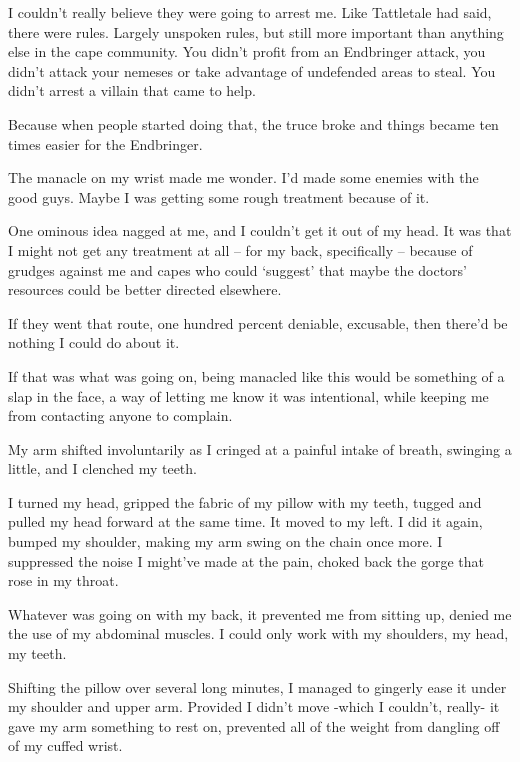 I couldn't really believe they were going to arrest me.  Like Tattletale had said, there were rules.  Largely unspoken rules, but still more important than anything else in the cape community.  You didn't profit from an Endbringer attack, you didn't attack your nemeses or take advantage of undefended areas to steal.  You didn't arrest a villain that came to help.



Because when people started doing that, the truce broke and things became ten times easier for the Endbringer.



The manacle on my wrist made me wonder.  I'd made some enemies with the good guys.  Maybe I was getting some rough treatment because of it.



One ominous idea nagged at me, and I couldn't get it out of my head.  It was that I might not get any treatment at all – for my back, specifically – because of grudges against me and capes who could `suggest' that maybe the doctors' resources could be better directed elsewhere.



If they went that route, one hundred percent deniable, excusable, then there'd be nothing I could do about it.



If that was what was going on, being manacled like this would be something of a slap in the face, a way of letting me know it was intentional, while keeping me from contacting anyone to complain.



My arm shifted involuntarily as I cringed at a painful intake of breath, swinging a little, and I clenched my teeth.



I turned my head, gripped the fabric of my pillow with my teeth, tugged and pulled my head forward at the same time.  It moved to my left.  I did it again, bumped my shoulder, making my arm swing on the chain once more.  I suppressed the noise I might've made at the pain, choked back the gorge that rose in my throat.



Whatever was going on with my back, it prevented me from sitting up, denied me the use of my abdominal muscles.  I could only work with my shoulders, my head, my teeth.



Shifting the pillow over several long minutes, I managed to gingerly ease it under my shoulder and upper arm.  Provided I didn't move -which I couldn't, really- it gave my arm something to rest on, prevented all of the weight from dangling off of my cuffed wrist.



